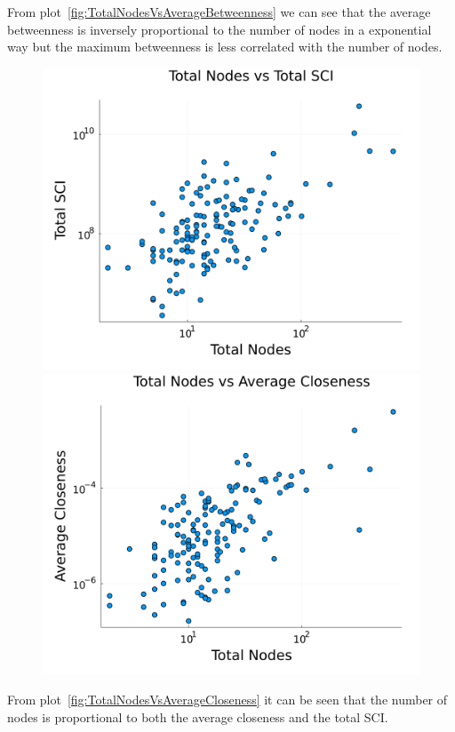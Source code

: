 From plot~\ref{fig:TotalNodesVsAverageBetweenness} we can see that the average betweenness is inversely proportional to the number of nodes in a exponential way but the maximum betweenness is less correlated with the number of nodes.

\begin{figure}[H]
    \centering
    \begin{minipage}{0.48\textwidth}
        \centering
        \includegraphics[width=1\textwidth]{images/task44/TotalNodesVsTotalSCI.png}
    \end{minipage}
    \begin{minipage}{0.5\textwidth}
        \centering
        \includegraphics[width=1\textwidth]{images/task44/TotalNodesVsAverageCloseness.png}
    \end{minipage}
    \caption{}
    \label{fig:TotalNodesVsAverageCloseness}
    \label{fig:TotalNodesVsTotalSCI}
\end{figure}

From plot~\ref{fig:TotalNodesVsAverageCloseness} it can be seen that the number of nodes is proportional to both the average closeness and the total SCI.

\newpage